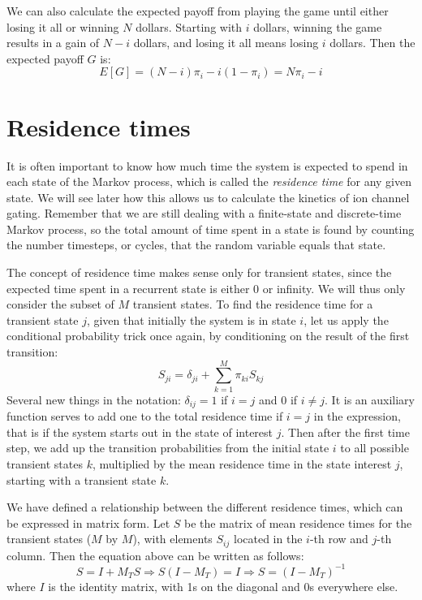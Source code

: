 \documentclass[11pt]{book}
\begin{document}
We can also calculate the expected payoff from playing the game until either losing it all or winning $N$ dollars. Starting with $i$ dollars, winning the game results in a gain of $N-i$ dollars, and losing it all means losing $i$ dollars. Then the expected payoff $G$ is:
$$ E[G] =  (N-i)\pi_i - i(1-\pi_i) = N\pi_i - i  $$

\section{Residence times}
It is often important to know how much time the system is expected to spend in each state of the Markov process, which is called the \emph{residence time} for any given state. We will see later how this allows us to calculate the kinetics of ion channel gating. Remember that we are still dealing with a finite-state and discrete-time Markov process, so the total amount of time spent in a state is found by counting the number timesteps, or cycles, that the random variable equals that state.

The concept of residence time makes sense only for transient states, since the expected time spent in a recurrent state is either 0 or infinity. We will thus only consider the subset of $M$ transient states. To find the residence time for a transient state $j$, given that initially the system is in state $i$, let us apply the conditional probability trick once again, by conditioning on the result of the first transition:
$$S_{ji} = \delta_{ji} +  \sum_{k=1}^M \pi_{ki} S_{kj}$$
Several new things in the notation: $\delta_{ij} = 1$ if $i=j$ and 0 if $i \neq j$. It is an auxiliary function serves to add one to the total residence time if $i=j$ in the expression, that is if the system starts out in the state of interest $j$. Then after the first time step, we add up the transition probabilities from the initial state $i$ to all possible transient states $k$, multiplied by the mean residence time in the state interest $j$, starting with a transient state $k$.

We have defined a relationship between the different residence times, which can be expressed in matrix form. Let $S$ be the matrix of mean residence times for the transient states ($M$ by $M$), with elements $S_{ij}$ located in the $i$-th row and $j$-th column. Then the equation above can be written as follows:
$$  S = I + M_{T} S \Rightarrow S(I -M_T) = I  \Rightarrow S = (I - M_T )^{-1} $$
where $I$ is the identity matrix, with 1s on the diagonal and 0s everywhere else.
\end{document}
